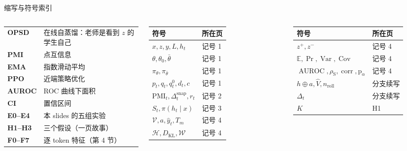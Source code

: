 \documentclass[aspectratio=169,11pt]{beamer}
\newcommand{\E}{\mathbb{E}}
\newcommand{\pit}{\pi_\theta}
\newcommand{\pitea}{\pi_{\bar\theta}}
\newcommand{\KL}{D_{\mathrm{KL}}}
\newcommand{\AUROC}{\operatorname{AUROC}}
\newcommand{\PMI}{\mathrm{PMI}}
\newcommand{\snap}{\Delta^{\mathrm{snap}}}
\newcommand{\Vh}{\hat V}
\begin{document}
\begin{frame}{缩写与符号索引}
\scriptsize
\setlength{\tabcolsep}{3pt}\renewcommand{\arraystretch}{1.12}
\begin{columns}[T]
\begin{tabularx}{\linewidth}{@{}>{\bfseries}l Y@{}}
\toprule
OPSD & 在线自蒸馏：老师是看到 $z$ 的学生自己\\
PMI & 点互信息\\
EMA & 指数滑动平均\\
PPO & 近端策略优化\\
AUROC & ROC 曲线下面积\\
CI & 置信区间\\
E0--E4 & 本 slides 的五组实验\\
H1--H3 & 三个假设（一页故事）\\
F0--F7 & 逐 token 特征（第 4 节）\\
\bottomrule
\end{tabularx}
\begin{tabular}{@{}ll@{}}
\toprule
\textbf{符号} & \textbf{所在页}\\ \midrule
$x,z,y,L,h_t$ & 记号 1\\
$\theta,\theta_0,\bar\theta$ & 记号 1\\
$\pit,\pitea$ & 记号 1\\
$p_t,q_t,q^0_t,d_t,c$ & 记号 1\\
$\PMI_t,\snap_t,r_t$ & 记号 2\\
$S_t,\pi(h_t\mid x)$ & 记号 3\\
$\mathcal V,a,\hat y_t,T_m$ & 记号 4\\
$\mathcal H,\KL,\mathcal W$ & 记号 4\\
\bottomrule
\end{tabular}
\begin{tabular}{@{}ll@{}}
\toprule
\textbf{符号} & \textbf{所在页}\\ \midrule
$z^+,z^-$ & 记号 4\\
$\E,\Pr,\operatorname{Var},\operatorname{Cov}$ & 记号 4\\
$\AUROC,\rho_{\mathrm S},\operatorname{corr},\mathrm p_\alpha$ & 记号 4\\
$h\oplus a,\Vh,n_{\mathrm{roll}}$ & 分支续写\\
$\Delta_t$ & 分支续写\\
$K$ & H1\\
\bottomrule
\end{tabular}
\end{columns}
\end{frame}
\end{document}
